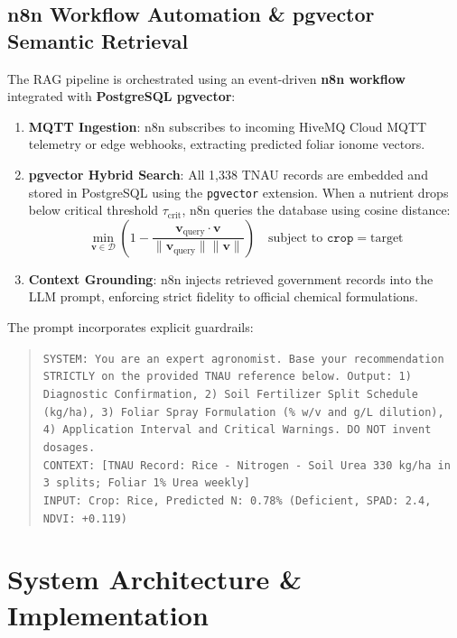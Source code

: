 \documentclass[9pt,twocolumn,a4paper,landscape]{article}
\begin{document}
\subsection{n8n Workflow Automation \& pgvector Semantic Retrieval}
The RAG pipeline is orchestrated using an event-driven \textbf{n8n workflow} integrated with \textbf{PostgreSQL pgvector}:
\begin{enumerate}[leftmargin=*]
    \item \textbf{MQTT Ingestion}: n8n subscribes to incoming HiveMQ Cloud MQTT telemetry or edge webhooks, extracting predicted foliar ionome vectors.
    \item \textbf{pgvector Hybrid Search}: All 1,338 TNAU records are embedded and stored in PostgreSQL using the \texttt{pgvector} extension. When a nutrient drops below critical threshold $\tau_{\text{crit}}$, n8n queries the database using cosine distance:
    \begin{equation*}
        \min_{\mathbf{v} \in \mathcal{D}} \left( 1 - \frac{\mathbf{v}_{\text{query}} \cdot \mathbf{v}}{\|\mathbf{v}_{\text{query}}\| \|\mathbf{v}\|} \right) \quad \text{subject to } \texttt{crop} = \text{target}
    \end{equation*}
    \item \textbf{Context Grounding}: n8n injects retrieved government records into the LLM prompt, enforcing strict fidelity to official chemical formulations.
\end{enumerate}

The prompt incorporates explicit guardrails:
\begin{quote}
\scriptsize\texttt{SYSTEM: You are an expert agronomist. Base your recommendation STRICTLY on the provided TNAU reference below. Output: 1) Diagnostic Confirmation, 2) Soil Fertilizer Split Schedule (kg/ha), 3) Foliar Spray Formulation (\% w/v and g/L dilution), 4) Application Interval and Critical Warnings. DO NOT invent dosages.\\
CONTEXT: [TNAU Record: Rice - Nitrogen - Soil Urea 330 kg/ha in 3 splits; Foliar 1\% Urea weekly]\\
INPUT: Crop: Rice, Predicted N: 0.78\% (Deficient, SPAD: 2.4, NDVI: +0.119)}
\end{quote}

\section{System Architecture \& Implementation}
\label{sec:system}
\end{document}
